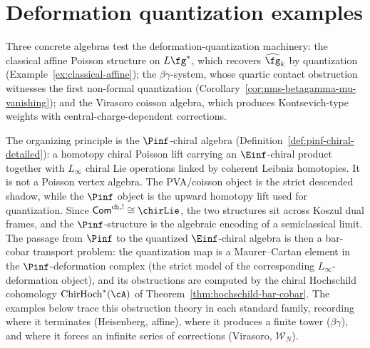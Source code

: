 
\chapter{Deformation quantization examples}
\label{chap:deformation-examples}

Three concrete algebras test the deformation-quantization machinery:
the classical affine Poisson structure on $L\fg^*$, which recovers
$\widehat{\fg}_k$ by quantization
(Example~\ref{ex:classical-affine}); the $\beta\gamma$-system, whose
quartic contact obstruction witnesses the first non-formal quantization
(Corollary~\ref{cor:nms-betagamma-mu-vanishing}); and the Virasoro
coisson algebra, which produces Kontsevich-type weights with
central-charge-dependent corrections.

The organizing principle is the $\Pinf$-chiral algebra
(Definition~\ref{def:pinf-chiral-detailed}): a homotopy chiral
Poisson lift carrying an $\Einf$-chiral product together with
$L_\infty$ chiral Lie operations linked by coherent Leibniz
homotopies. It is not a Poisson vertex algebra. The PVA/coisson
object is the strict descended shadow, while the $\Pinf$ object is
the upward homotopy lift used for quantization.
Since $\mathsf{Com}^{\mathrm{ch},!} \cong \chirLie$, the two structures sit across
Koszul dual frames, and the $\Pinf$-structure is the algebraic
encoding of a semiclassical limit. The passage from $\Pinf$ to the
quantized $\Einf$-chiral algebra is then a bar-cobar transport
problem: the quantization map is a Maurer--Cartan element in the
$\Pinf$-deformation complex (the strict model of the corresponding
$L_\infty$-deformation object), and its obstructions are computed by
the chiral Hochschild cohomology $\operatorname{ChirHoch}^*(\cA)$ of
Theorem~\ref{thm:hochschild-bar-cobar}. The examples below trace this
obstruction theory in each standard family, recording where it
terminates (Heisenberg, affine), where it produces a finite tower
($\beta\gamma$), and where it forces an infinite series of corrections
(Virasoro, $\mathcal{W}_N$).

